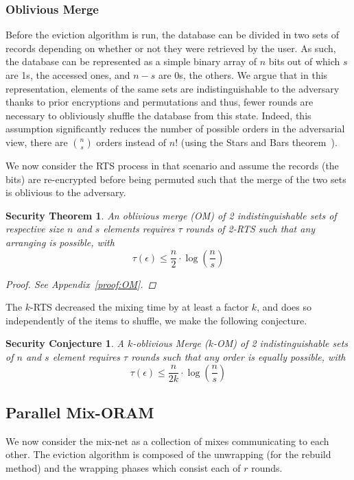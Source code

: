 \documentclass{llncs}
\newtheorem{secthm}{Security Theorem}
\newtheorem{seccjt}{Security Conjecture}
\begin{document}
\subsubsection{Oblivious Merge}\label{OM}
Before the eviction algorithm is run, the database can be divided in two sets of records depending on whether or not they were retrieved by the user. As such, the database can be represented as a simple binary array of $n$ bits out of which $s$ are 1s, the accessed ones, and $n-s$ are 0s, the others.
We argue that in this representation, elements of the same sets are indistinguishable to the adversary thanks to prior encryptions and permutations and thus, fewer rounds are necessary to obliviously shuffle the database from this state. Indeed, this assumption significantly reduces the number of possible orders in the adversarial view, there are  ${n \choose s}$ orders instead of $n!$ (using the Stars and Bars theorem~\cite{feller1950probability}).

We now consider the RTS process in that scenario and assume the records (the bits) are re-encrypted before being permuted such that the merge of the two sets is oblivious to the adversary.

\begin{secthm}
An oblivious merge (OM) of 2 indistinguishable sets of respective size $n$ and $s$ elements requires $\tau$ rounds of 2-RTS such that any arranging is possible, with
$$\tau(\epsilon) \leq \frac{n}{2}  \cdot \log \left (\frac{n}{s}\right)$$%
\begin{proof}
See Appendix~\ref{proof:OM}.
\end{proof}
\end{secthm}

The $k$-RTS decreased the mixing time by at least a factor $k$, and does so independently of the items to shuffle, we make the following conjecture.

\begin{seccjt}\label{sec:kOM}
A $k$-oblivious Merge ($k$-OM) of 2 indistinguishable sets of $n$ and $s$ element requires $\tau$ rounds such that any order is equally possible, with
$$ \tau(\epsilon) \leq \frac{n}{2k}  \cdot \log \left (\frac{n}{s}\right) $$
\end{seccjt}
%
\subsection{Parallel Mix-ORAM}\label{parallelMixORAM}
%
We now consider the mix-net as a collection of mixes communicating to each other. The eviction algorithm is composed of the unwrapping (for the rebuild method) and the wrapping phases which consist each of $r$ rounds.
\end{document}
